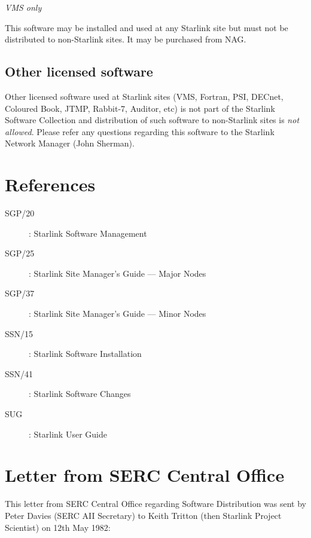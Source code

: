 {\em VMS only}

This software may be installed and used at any Starlink site but must not
be distributed to non-Starlink sites.
It may be purchased from NAG.

\subsection {Other licensed software}

Other licensed software used at Starlink sites (VMS, Fortran, PSI, DECnet,
Coloured Book, JTMP, Rabbit-7, Auditor, etc) is not part of the Starlink
Software Collection and distribution of such software to non-Starlink sites is
{\em not allowed}.
Please refer any questions regarding this software to the Starlink Network
Manager (John Sherman).

\section {References}

\begin{description}
\begin{description}
\item [SGP/20]: Starlink Software Management
\item [SGP/25]: Starlink Site Manager's Guide --- Major Nodes
\item [SGP/37]: Starlink Site Manager's Guide --- Minor Nodes
\item [SSN/15]: Starlink Software Installation
\item [SSN/41]: Starlink Software Changes
\item [SUG]: Starlink User Guide
\end{description}
\end{description}

\newpage

\appendix

\section {Letter from SERC Central Office}
\label{se:lsco}

This letter from SERC Central Office regarding Software Distribution was sent by
Peter Davies (SERC AII Secretary) to Keith Tritton (then Starlink Project
Scientist) on 12th May 1982:

\vspace{25mm}

